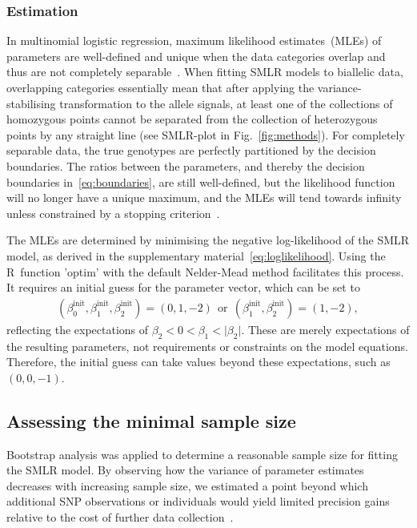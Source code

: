 \documentclass[preprint,5p,times,11pt]{elsarticle}
\begin{document}
\subsubsection{Estimation}
In multinomial logistic regression, maximum likelihood estimates~(MLEs) of parameters are well-defined and unique when the data categories overlap and thus are not completely separable~\cite{albert, lesaffre}.
When fitting SMLR models to biallelic data, overlapping categories essentially mean that after applying the variance-stabilising transformation to the allele signals, at least one of the collections of homozygous points cannot be separated from the collection of heterozygous points by any straight line (see SMLR-plot in Fig.~\ref{fig:methods}).
For completely separable data, the true genotypes are perfectly partitioned by the decision boundaries.
The ratios between the parameters, and thereby the decision boundaries in~\eqref{eq:boundaries}, are still well-defined, but the likelihood function will no longer have a unique maximum, and the MLEs will tend towards infinity unless constrained by a stopping criterion~\cite[p.~298]{agresti}.

The MLEs are determined by minimising the negative log-likelihood of the SMLR model, as derived in the supplementary material~\eqref{eq:loglikelihood}.
Using the R~function 'optim' with the default Nelder-Mead method facilitates this process.
It requires an initial guess for the parameter vector, which can be set to
\begin{align*}
\left(\beta_0^{\text{init}}, \beta_1^{\text{init}}, \beta_2^{\text{init}}\right)
=
\left(0, 1, -2\right)
\ \ \text{or} \ \ 
\left(\beta_1^{\text{init}}, \beta_2^{\text{init}}\right)
=
\left(1, -2\right),
\end{align*}
reflecting the expectations of $\beta_2 < 0 < \beta_1 < \lvert \beta_2 \rvert$.
These are merely expectations of the resulting parameters, not requirements or constraints on the model equations.
Therefore, the initial guess can take values beyond these expectations, such as $\left(0, 0, -1\right)$.


\subsection{Assessing the minimal sample size}
Bootstrap analysis was applied to determine a reasonable sample size for fitting the SMLR model.
By observing how the variance of parameter estimates decreases with increasing sample size, we estimated a point beyond which additional SNP observations or individuals would yield limited precision gains relative to the cost of further data collection~\cite{efron}.
\end{document}
